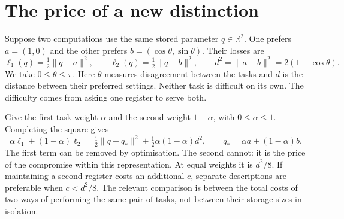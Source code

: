 \section{The price of a new distinction}
\label{section:the-price-of-a-shared-description}

Suppose two computations use the same stored parameter $q\in\mathbb R^2$. One prefers $a=(1,0)$ and the other prefers $b=(\cos\theta,\sin\theta)$. Their losses are
\begin{equation}
 \ell_1(q)=\tfrac12\|q-a\|^2,\qquad
 \ell_2(q)=\tfrac12\|q-b\|^2,\qquad
 d^2=\|a-b\|^2=2(1-\cos\theta).
 \label{eq:register-losses}
\end{equation}
We take $0\leq\theta\leq\pi$. Here $\theta$ measures disagreement between the tasks and $d$ is the distance between their preferred settings. Neither task is difficult on its own. The difficulty comes from asking one register to serve both.

Give the first task weight $\alpha$ and the second weight $1-\alpha$, with $0\leq\alpha\leq1$. Completing the square gives
\begin{equation}
 \alpha\ell_1+(1-\alpha)\ell_2
 =\tfrac12\|q-q_*\|^2+\tfrac12\alpha(1-\alpha)d^2,
 \qquad q_*=\alpha a+(1-\alpha)b.
 \label{eq:register-square}
\end{equation}
The first term can be removed by optimisation. The second cannot: it is the price of the compromise within this representation. At equal weights it is $d^2/8$. If maintaining a second register costs an additional $c$, separate descriptions are preferable when $c<d^2/8$. The relevant comparison is between the total costs of two ways of performing the same pair of tasks, not between their storage sizes in isolation.

